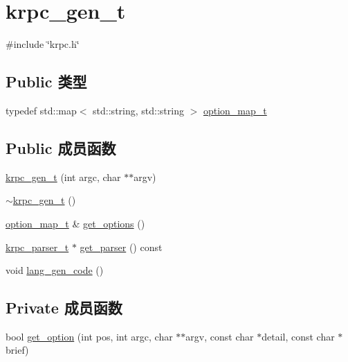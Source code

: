 \hypertarget{classkrpc__gen__t}{}\section{krpc\+\_\+gen\+\_\+t}
\label{classkrpc__gen__t}


{\ttfamily \#include \char`\"{}krpc.\+h\char`\"{}}

\subsection*{Public 类型}
\begin{DoxyCompactItemize}
\item 
typedef std\+::map$<$ std\+::string, std\+::string $>$ \hyperlink{classkrpc__gen__t_a196bb243e2043de12bc0b0563c1e0e7c}{option\+\_\+map\+\_\+t}
\end{DoxyCompactItemize}
\subsection*{Public 成员函数}
\begin{DoxyCompactItemize}
\item 
\hyperlink{classkrpc__gen__t_a5401a305cb40981a42b3a367cd38528b}{krpc\+\_\+gen\+\_\+t} (int argc, char $\ast$$\ast$argv)
\item 
\hyperlink{classkrpc__gen__t_aa022a5729e7d36e4183575d745615e15}{$\sim$krpc\+\_\+gen\+\_\+t} ()
\item 
\hyperlink{classkrpc__gen__t_a196bb243e2043de12bc0b0563c1e0e7c}{option\+\_\+map\+\_\+t} \& \hyperlink{classkrpc__gen__t_a1cb93acb93633a6623af57df434eceea}{get\+\_\+options} ()
\item 
\hyperlink{classkrpc__parser__t}{krpc\+\_\+parser\+\_\+t} $\ast$ \hyperlink{classkrpc__gen__t_aec462c23e60d079e8ade3ea6d5ee683a}{get\+\_\+parser} () const 
\item 
void \hyperlink{classkrpc__gen__t_ab15d4e7f98e7348e23ae60ccd830ff05}{lang\+\_\+gen\+\_\+code} ()
\end{DoxyCompactItemize}
\subsection*{Private 成员函数}
\begin{DoxyCompactItemize}
\item 
bool \hyperlink{classkrpc__gen__t_a743c2c11e56b40b80306c930b1041605}{get\+\_\+option} (int pos, int argc, char $\ast$$\ast$argv, const char $\ast$detail, const char $\ast$brief)
\end{DoxyCompactItemize}
